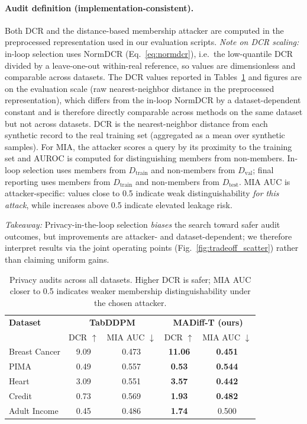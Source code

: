 \documentclass[preprint,12pt]{elsarticle}
\begin{document}
\paragraph{Audit definition (implementation-consistent).}
Both DCR and the distance-based membership attacker are computed in the preprocessed representation used in our evaluation scripts. \emph{Note on DCR scaling:} in-loop selection uses NormDCR (Eq.~\ref{eq:normdcr}), i.e.\ the low-quantile DCR divided by a leave-one-out within-real reference, so values are dimensionless and comparable across datasets. The DCR values reported in Tables~\ref{tab:results_privacy_all} and figures are on the evaluation scale (raw nearest-neighbor distance in the preprocessed representation), which differs from the in-loop NormDCR by a dataset-dependent constant and is therefore directly comparable across methods on the same dataset but not across datasets.
DCR is the nearest-neighbor distance from each synthetic record to the real training set (aggregated as a mean over synthetic samples). For MIA, the attacker scores a query by its proximity to the training set and AUROC is computed for distinguishing members from non-members. In-loop selection uses members from $D_{\text{train}}$ and non-members from $D_{\text{val}}$; final reporting uses members from $D_{\text{train}}$ and non-members from $D_{\text{test}}$. MIA AUC is attacker-specific: values close to 0.5 indicate weak distinguishability \emph{for this attack}, while increases above 0.5 indicate elevated leakage risk.

\noindent\textit{Takeaway:} Privacy-in-the-loop selection \emph{biases} the search toward safer audit outcomes, but improvements are attacker- and dataset-dependent; we therefore interpret results via the joint operating points (Fig.~\ref{fig:tradeoff_scatter}) rather than claiming uniform gains.

\begin{table}[!t]
\centering
\caption{Privacy audits across all datasets. Higher DCR is safer; MIA AUC closer to 0.5 indicates weaker membership distinguishability under the chosen attacker.}
\label{tab:results_privacy_all}
\scriptsize
\setlength{\tabcolsep}{5.5pt}
\renewcommand{\arraystretch}{1.15}
\begin{tabular}{l|c c|c c}
\rowcolor{gray!20}
\textbf{Dataset} &
\multicolumn{2}{c|}{\textbf{TabDDPM}} &
\multicolumn{2}{c}{\textbf{MADiff-T (ours)}} \\
\rowcolor{gray!20}
& DCR $\uparrow$ & MIA AUC $\downarrow$ & DCR $\uparrow$ & MIA AUC $\downarrow$ \\
\hline
Breast Cancer & 9.09 & 0.473 & \textbf{11.06} & \textbf{0.451} \\
PIMA          & 0.49 & 0.557 & \textbf{0.53}  & \textbf{0.544} \\
Heart         & 3.09 & 0.551 & \textbf{3.57}  & \textbf{0.442} \\
Credit        & 0.73 & 0.569 & \textbf{1.93}  & \textbf{0.482} \\
Adult Income  & 0.45 & 0.486 & \textbf{1.74}  & 0.500          \\
\end{tabular}
\end{table}
\end{document}
